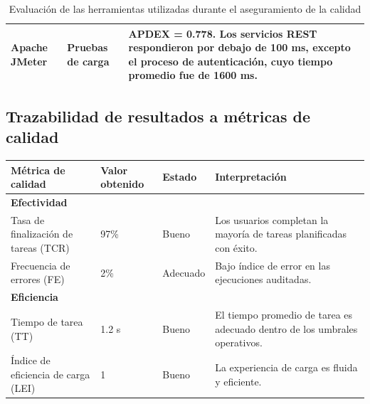 \begin{table}[H]
\begin{tabular}{|p{3cm}|p{5cm}|p{6cm}|}
        Apache JMeter                          &
        Pruebas de carga                       &
        APDEX = 0.778. Los servicios REST respondieron por debajo de 100 ms, excepto el proceso de autenticación, cuyo tiempo promedio fue de 1600 ms.                     \\
        \hline
    \end{tabular}
    \caption{Evaluación de las herramientas utilizadas durante el aseguramiento de la calidad}
    \label{tab:herramientas}
\end{table}

\subsection{Trazabilidad de resultados a métricas de calidad}

\begin{table}[H]
    \centering
    \scriptsize
    \begin{tabular}{|p{4cm}|p{3cm}|p{3cm}|p{5cm}|}
        \hline
        \textbf{Métrica de calidad}                        & \textbf{Valor obtenido} & \textbf{Estado} & \textbf{Interpretación}                                                         \\
        \hline
        \multicolumn{4}{|l|}{\textbf{Efectividad}}                                                                                                                                       \\
        \hline
        Tasa de finalización de tareas (TCR)               & 97\%                    & Bueno           & Los usuarios completan la mayoría de tareas planificadas con éxito.             \\
        \hline
        Frecuencia de errores (FE)                         & 2\%                     & Adecuado        & Bajo índice de error en las ejecuciones auditadas.                              \\
        \hline
        \multicolumn{4}{|l|}{\textbf{Eficiencia}}                                                                                                                                        \\
        \hline
        Tiempo de tarea (TT)                               & 1.2 s                   & Bueno       & El tiempo promedio de tarea es adecuado dentro de los umbrales operativos.      \\
        \hline
        Índice de eficiencia de carga (LEI)                & 1                       & Bueno           & La experiencia de carga es fluida y eficiente.                                  \\

\end{tabular}
\end{table}

